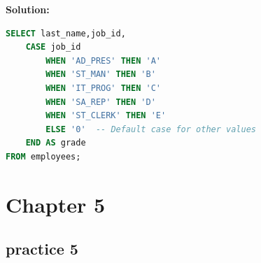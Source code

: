 \documentclass[a4paper,12pt]{article}
\begin{document}
\begin{enumerate}
    \textbf{Solution: }
    \begin{lstlisting}[language=SQL]
SELECT last_name,job_id,
    CASE job_id
        WHEN 'AD_PRES' THEN 'A'
        WHEN 'ST_MAN' THEN 'B'
        WHEN 'IT_PROG' THEN 'C'
        WHEN 'SA_REP' THEN 'D'
        WHEN 'ST_CLERK' THEN 'E'
        ELSE '0'  -- Default case for other values
    END AS grade
FROM employees;

    \end{lstlisting}
\end{enumerate}

\newpage
\section*{Chapter 5}
\subsection*{practice 5}
\end{document}
